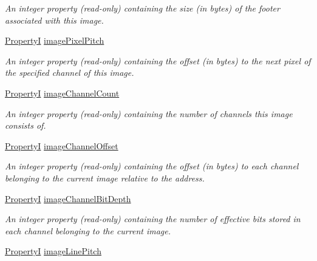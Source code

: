 \begin{DoxyCompactItemize}
\begin{DoxyCompactList}\small\item\em An integer property {\bfseries }(read-\/only) containing the size (in bytes) of the footer associated with this image. \end{DoxyCompactList}\item 
\hyperlink{group___common_interface_ga12d5e434238ca242a1ba4c6c3ea45780}{Property\+I} \hyperlink{classmv_i_m_p_a_c_t_1_1acquire_1_1_request_a00bdcb0cbf23ca71092474d93a80fb0c}{image\+Pixel\+Pitch}
\begin{DoxyCompactList}\small\item\em An integer property {\bfseries }(read-\/only) containing the offset (in bytes) to the next pixel of the specified channel of this image. \end{DoxyCompactList}\item 
\hyperlink{group___common_interface_ga12d5e434238ca242a1ba4c6c3ea45780}{Property\+I} \hyperlink{classmv_i_m_p_a_c_t_1_1acquire_1_1_request_abdd5f9eac58473f54725987c7fd1d9a7}{image\+Channel\+Count}
\begin{DoxyCompactList}\small\item\em An integer property {\bfseries }(read-\/only) containing the number of channels this image consists of. \end{DoxyCompactList}\item 
\hyperlink{group___common_interface_ga12d5e434238ca242a1ba4c6c3ea45780}{Property\+I} \hyperlink{classmv_i_m_p_a_c_t_1_1acquire_1_1_request_a06a1b6f82fadab310b409434af963b36}{image\+Channel\+Offset}
\begin{DoxyCompactList}\small\item\em An integer property {\bfseries }(read-\/only) containing the offset (in bytes) to each channel belonging to the current image relative to the address. \end{DoxyCompactList}\item 
\hyperlink{group___common_interface_ga12d5e434238ca242a1ba4c6c3ea45780}{Property\+I} \hyperlink{classmv_i_m_p_a_c_t_1_1acquire_1_1_request_aee32f6b6dabfd192119afa932045ecbe}{image\+Channel\+Bit\+Depth}
\begin{DoxyCompactList}\small\item\em An integer property {\bfseries }(read-\/only) containing the number of effective bits stored in each channel belonging to the current image. \end{DoxyCompactList}\item 
\hyperlink{group___common_interface_ga12d5e434238ca242a1ba4c6c3ea45780}{Property\+I} \hyperlink{classmv_i_m_p_a_c_t_1_1acquire_1_1_request_ac94ef78b0834deb1f291dacc97c600bc}{image\+Line\+Pitch}

\end{DoxyCompactItemize}
